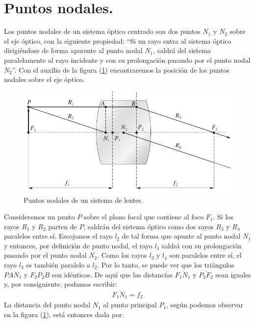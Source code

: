 \documentclass[14pt]{extarticle}
\begin{document}
\section{Puntos nodales.}

Los puntos nodales de un sistema óptico centrado son dos puntos $N_{1}$ y $N_{2}$ sobre el eje óptico, con la siguiente propiedad: \enquote{Si un rayo entra al sistema óptico dirigiéndose de forma aparente al punto nodal $N_{1}$, saldrá del sistema paralelamente al rayo incidente y con su prolongación pasando por el punto nodal $N_{2}$}. Con el auxilio de la figura (\ref{fig:figura_III_04}) encontraremos la posición de los puntos nodales sobre el eje óptico.
\begin{figure}[H]
    \centering
    \includegraphics[scale=0.7]{Imagenes/Lentes_Gruesas_04.png}
    \caption{Puntos nodales de un sistema de lentes.}
    \label{fig:figura_III_04}
\end{figure}
Consideremos un punto $P$ sobre el plano focal que contiene al foco $F_{1}$. Si los
rayos $R_{1}$ y $R_{2}$ parten de $P$, saldrán del sistema óptico como dos rayos $R_{3}$ y $R_{4}$ paralelos entre sí. Escojamos el rayo $l_{2}$ de tal forma que apunte al punto nodal $N_{1}$ y entonces, por definición de punto nodal, el rayo $l_{4}$ saldrá con su prolongación pasando por el punto nodal $N_{2}$. Como los rayos $l_{3}$ y $l_{4}$ son paralelos entre sí, el rayo $l_{3}$ es también paralelo a $l_{2}$. Por lo tanto, se puede ver que los triángulos $PAN_{1}$ y $F_{2} P_{2} B$ son idénticos. De aquí que las distancias $\overline{F_{1} N_{1}}$ y $\overline{P_{2} F_{2}}$ sean iguales y, por consiguiente, podamos escribir:
\begin{align}
\overline{F_{1} N_{1}} = f_{2}
\label{eq:ecuacion_III_19}
\end{align}
La distancia del punto nodal $N_{1}$ al punto principal $P_{1}$, según podemos observar en la figura (\ref{fig:figura_III_04}), está entonces dada por:
\end{document}
